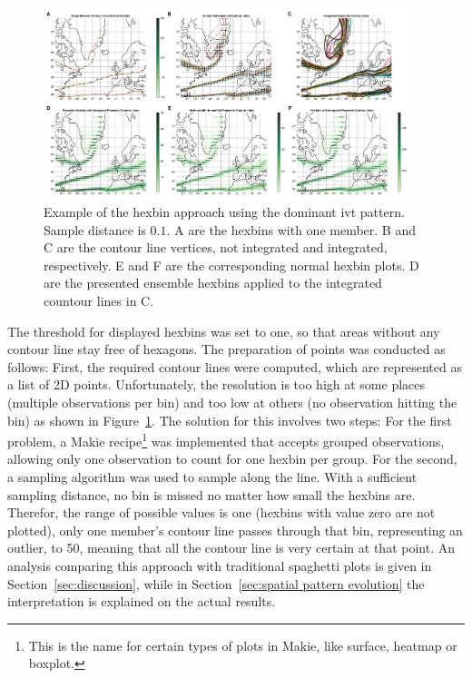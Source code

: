 \begin{figure}[bht]
  \begin{center}
    \includegraphics[width=0.95\textwidth]{figures/ensemble_hexbin_explaination.png}
  \end{center}
  \caption[Ensemble Hexbin Explanation]{Example of the hexbin approach using the dominant \ac{ivt} pattern. Sample distance is $0.1$. A are the hexbins with one member. B and C are the contour line vertices, not integrated and integrated, respectively. E and F are the corresponding normal hexbin plots. D are the presented ensemble hexbins applied to the integrated countour lines in C. }\label{fig:hexbin overview}
\end{figure}

The threshold for displayed hexbins was set to one, so that areas without any contour line stay free of hexagons. 
The preparation of points was conducted as follows: First, the required contour lines were computed, which are represented as a list of 2D points. 
Unfortunately, the resolution is too high at some places (multiple observations per bin) and too low at others (no observation hitting the bin) as shown in Figure~\ref{fig:hexbin overview}. 
The solution for this involves two steps: 
For the first problem, a Makie recipe\footnote{This is the name for certain types of plots in Makie, like surface, heatmap or boxplot.} was implemented that accepts grouped observations, allowing only one observation to count for one hexbin per group. 
For the second, a sampling algorithm was used to sample along the line. 
With a sufficient sampling distance, no bin is missed no matter how small the hexbins are. 
Therefor, the range of possible values is one (hexbins with value zero are not plotted), only one member's contour line passes through that bin, representing an outlier, to 50, meaning that all the contour line is very certain at that point. 
An analysis comparing this approach with traditional spaghetti plots is given in Section~\ref{sec:discussion}, while in Section~\ref{sec:spatial pattern evolution} the interpretation is explained on the actual results. 



